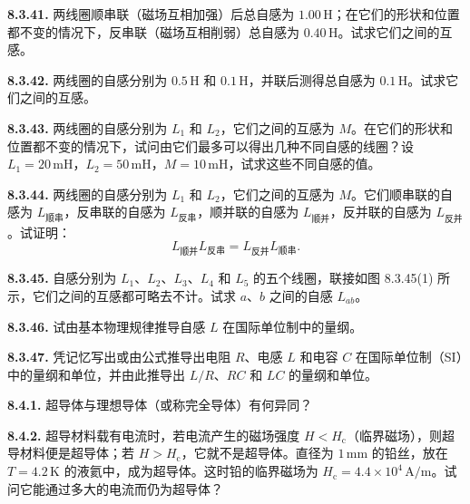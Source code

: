 \vfill
\newpage

\textbf{8.3.41.} 两线圈顺串联（磁场互相加强）后总自感为 $1.00\,\mathrm{H}$；在它们的形状和位置都不变的情况下，反串联（磁场互相削弱）总自感为 $0.40\,\mathrm{H}$。试求它们之间的互感。

\vfill
\newpage

\textbf{8.3.42.} 两线圈的自感分别为 $0.5\,\mathrm{H}$ 和 $0.1\,\mathrm{H}$，并联后测得总自感为 $0.1\,\mathrm{H}$。试求它们之间的互感。

\vfill
\newpage

\textbf{8.3.43.} 两线圈的自感分别为 $L_{1}$ 和 $L_{2}$，它们之间的互感为 $M$。在它们的形状和位置都不变的情况下，试问由它们最多可以得出几种不同自感的线圈？设 $L_{1} = 20\,\mathrm{mH}$，$L_{2} = 50\,\mathrm{mH}$，$M = 10\,\mathrm{mH}$，试求这些不同自感的值。

\vfill
\newpage

\textbf{8.3.44.} 两线圈的自感分别为 $L_{1}$ 和 $L_{2}$，它们之间的互感为 $M$。它们顺串联的自感为 $L_{\text{顺串}}$，反串联的自感为 $L_{\text{反串}}$，顺并联的自感为 $L_{\text{顺并}}$，反并联的自感为 $L_{\text{反并}}$。试证明：
\[
L_{\text{顺并}} L_{\text{反串}} = L_{\text{反并}} L_{\text{顺串}}.
\]

\vfill
\newpage

\textbf{8.3.45.} 自感分别为 $L_{1}$、$L_{2}$、$L_{3}$、$L_{4}$ 和 $L_{5}$ 的五个线圈，联接如图 8.3.45(1) 所示，它们之间的互感都可略去不计。试求 $a$、$b$ 之间的自感 $L_{ab}$。

\begin{center}
\end{center}

\vfill
\newpage

\textbf{8.3.46.} 试由基本物理规律推导自感 $L$ 在国际单位制中的量纲。

\vfill
\newpage

\textbf{8.3.47.} 凭记忆写出或由公式推导出电阻 $R$、电感 $L$ 和电容 $C$ 在国际单位制（SI）中的量纲和单位，并由此推导出 $L/R$、$RC$ 和 $LC$ 的量纲和单位。

\vfill
\newpage

\textbf{8.4.1.} 超导体与理想导体（或称完全导体）有何异同？

\vfill
\newpage

\textbf{8.4.2.} 超导材料载有电流时，若电流产生的磁场强度 $H < H_{\mathrm{c}}$（临界磁场），则超导材料便是超导体；若 $H > H_{\mathrm{c}}$，它就不是超导体。直径为 $1\,\mathrm{mm}$ 的铅丝，放在 $T = 4.2\,\mathrm{K}$ 的液氦中，成为超导体。这时铅的临界磁场为 $H_{\mathrm{c}} = 4.4 \times 10^{4}\,\mathrm{A/m}$。试问它能通过多大的电流而仍为超导体？

